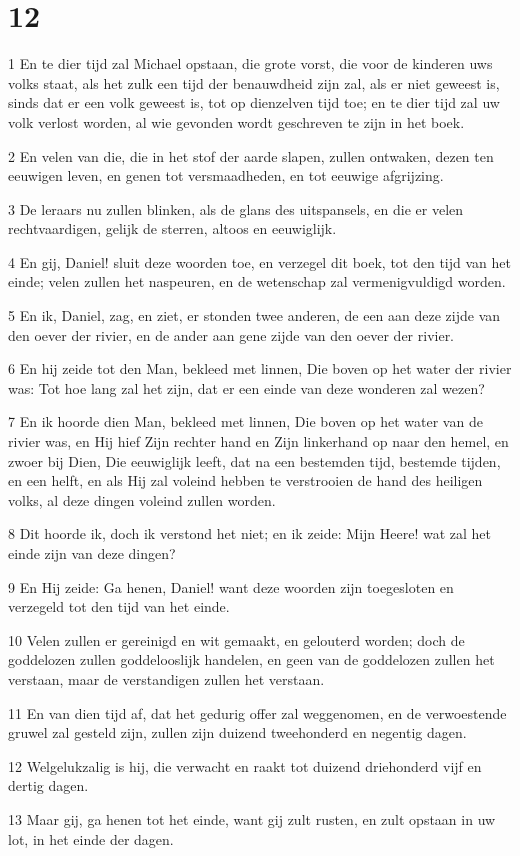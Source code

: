 \chapter{12}

\par 1 En te dier tijd zal Michael opstaan, die grote vorst, die voor de kinderen uws volks staat, als het zulk een tijd der benauwdheid zijn zal, als er niet geweest is, sinds dat er een volk geweest is, tot op dienzelven tijd toe; en te dier tijd zal uw volk verlost worden, al wie gevonden wordt geschreven te zijn in het boek.
\par 2 En velen van die, die in het stof der aarde slapen, zullen ontwaken, dezen ten eeuwigen leven, en genen tot versmaadheden, en tot eeuwige afgrijzing.
\par 3 De leraars nu zullen blinken, als de glans des uitspansels, en die er velen rechtvaardigen, gelijk de sterren, altoos en eeuwiglijk.
\par 4 En gij, Daniel! sluit deze woorden toe, en verzegel dit boek, tot den tijd van het einde; velen zullen het naspeuren, en de wetenschap zal vermenigvuldigd worden.
\par 5 En ik, Daniel, zag, en ziet, er stonden twee anderen, de een aan deze zijde van den oever der rivier, en de ander aan gene zijde van den oever der rivier.
\par 6 En hij zeide tot den Man, bekleed met linnen, Die boven op het water der rivier was: Tot hoe lang zal het zijn, dat er een einde van deze wonderen zal wezen?
\par 7 En ik hoorde dien Man, bekleed met linnen, Die boven op het water van de rivier was, en Hij hief Zijn rechter hand en Zijn linkerhand op naar den hemel, en zwoer bij Dien, Die eeuwiglijk leeft, dat na een bestemden tijd, bestemde tijden, en een helft, en als Hij zal voleind hebben te verstrooien de hand des heiligen volks, al deze dingen voleind zullen worden.
\par 8 Dit hoorde ik, doch ik verstond het niet; en ik zeide: Mijn Heere! wat zal het einde zijn van deze dingen?
\par 9 En Hij zeide: Ga henen, Daniel! want deze woorden zijn toegesloten en verzegeld tot den tijd van het einde.
\par 10 Velen zullen er gereinigd en wit gemaakt, en gelouterd worden; doch de goddelozen zullen goddelooslijk handelen, en geen van de goddelozen zullen het verstaan, maar de verstandigen zullen het verstaan.
\par 11 En van dien tijd af, dat het gedurig offer zal weggenomen, en de verwoestende gruwel zal gesteld zijn, zullen zijn duizend tweehonderd en negentig dagen.
\par 12 Welgelukzalig is hij, die verwacht en raakt tot duizend driehonderd vijf en dertig dagen.
\par 13 Maar gij, ga henen tot het einde, want gij zult rusten, en zult opstaan in uw lot, in het einde der dagen.



